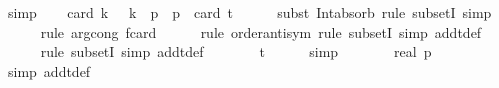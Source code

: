 \begin{isabellebody}
\ simp\isanewline
\isanewline
\ \ \isamarkupfalse%
\ {\isachardoublequoteopen}card\ {\isacharparenleft}{\kern0pt}{\isacharbraceleft}{\kern0pt}k{\isachardot}{\kern0pt}\ {}\ {\isacharasterisk}{\kern0pt}\ k\ {\isacharless}{\kern0pt}\ p{\isacharbraceright}{\kern0pt}\ {\isasyminter}\ {\isacharbraceleft}{\kern0pt}{}{\isachardot}{\kern0pt}{\isachardot}{\kern0pt}{\isacharless}{\kern0pt}p{\isacharbraceright}{\kern0pt}{\isacharparenright}{\kern0pt}\ {\isacharequal}{\kern0pt}\ card\ {\isacharparenleft}{\kern0pt}{\isacharbraceleft}{\kern0pt}{}{\isachardot}{\kern0pt}{\isachardot}{\kern0pt}t{\isacharbraceright}{\kern0pt}{\isacharparenright}{\kern0pt}{\isachardoublequoteclose}\isanewline
\ \ \ \ \isamarkupfalse%
\ {\isacharparenleft}{\kern0pt}subst\ Int{\isacharunderscore}{\kern0pt}absorb{}{\isacharcomma}{\kern0pt}\ rule\ subsetI{\isacharcomma}{\kern0pt}\ simp{\isacharparenright}{\kern0pt}\isanewline
\ \ \ \ \isamarkupfalse%
\ {\isacharparenleft}{\kern0pt}rule\ arg{\isacharunderscore}{\kern0pt}cong{\isacharbrackleft}{\kern0pt}\ f{\isacharequal}{\kern0pt}{\isachardoublequoteopen}card{\isachardoublequoteclose}{\isacharbrackright}{\kern0pt}{\isacharparenright}{\kern0pt}\isanewline
\ \ \ \ \isamarkupfalse%
\ {\isacharparenleft}{\kern0pt}rule\ order{\isacharunderscore}{\kern0pt}antisym{\isacharcomma}{\kern0pt}\ rule\ subsetI{\isacharcomma}{\kern0pt}\ simp\ add{\isacharcolon}{\kern0pt}t{\isacharunderscore}{\kern0pt}def{\isacharparenright}{\kern0pt}\ \isanewline
\ \ \ \ \isamarkupfalse%
\ {\isacharparenleft}{\kern0pt}rule\ subsetI{\isacharcomma}{\kern0pt}\ simp\ add{\isacharcolon}{\kern0pt}t{\isacharunderscore}{\kern0pt}def{\isacharparenright}{\kern0pt}\isanewline
\ \ \isamarkupfalse%
\ \isamarkupfalse%
\ {\isachardoublequoteopen}{\isachardot}{\kern0pt}{\isachardot}{\kern0pt}{\isachardot}{\kern0pt}\ {\isacharequal}{\kern0pt}\ t{\isacharplus}{\kern0pt}{}{\isachardoublequoteclose}\isanewline
\ \ \ \ \isamarkupfalse%
\ simp\isanewline
\ \ \isamarkupfalse%
\ \isamarkupfalse%
\ {\isachardoublequoteopen}{\isachardot}{\kern0pt}{\isachardot}{\kern0pt}{\isachardot}{\kern0pt}\ {\isacharequal}{\kern0pt}\ {\isacharparenleft}{\kern0pt}real\ p\ {\isacharplus}{\kern0pt}\ {}{\isacharparenright}{\kern0pt}{\isacharslash}{\kern0pt}{}{\isachardoublequoteclose}\isanewline
\ \ \ \ \isamarkupfalse%
\ {\isacharparenleft}{\kern0pt}simp\ add{\isacharcolon}{\kern0pt}t{\isacharunderscore}{\kern0pt}def{\isacharparenright}{\kern0pt}\isanewline

\end{isabellebody}
